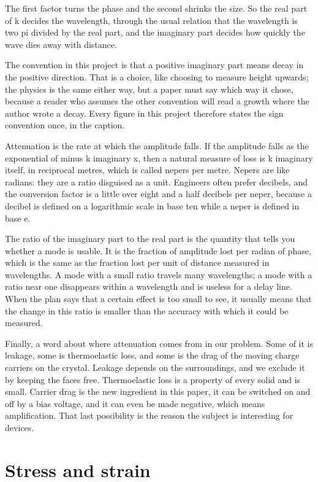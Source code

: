 \documentclass[11pt]{article}
\begin{document}
The first factor turns the phase and the second shrinks the size. So the real part of k decides the
wavelength, through the usual relation that the wavelength is two pi divided by the real part, and the
imaginary part decides how quickly the wave dies away with distance.

The convention in this project is that a positive imaginary part means decay in the positive direction. That
is a choice, like choosing to measure height upwards; the physics is the same either way, but a paper must
say which way it chose, because a reader who assumes the other convention will read a growth where the
author wrote a decay. Every figure in this project therefore states the sign convention once, in the caption.

Attenuation is the rate at which the amplitude falls. If the amplitude falls as the exponential of minus k
imaginary x, then a natural measure of loss is k imaginary itself, in reciprocal metres, which is called
nepers per metre. Nepers are like radians: they are a ratio disguised as a unit. Engineers often prefer
decibels, and the conversion factor is a little over eight and a half decibels per neper, because a decibel
is defined on a logarithmic scale in base ten while a neper is defined in base e.

The ratio of the imaginary part to the real part is the quantity that tells you whether a mode is usable. It
is the fraction of amplitude lost per radian of phase, which is the same as the fraction lost per unit of
distance measured in wavelengths. A mode with a small ratio travels many wavelengths; a mode with a ratio
near one disappears within a wavelength and is useless for a delay line. When the plan says that a certain
effect is too small to see, it usually means that the change in this ratio is smaller than the accuracy with
which it could be measured.

Finally, a word about where attenuation comes from in our problem. Some of it is leakage, some is
thermoelastic loss, and some is the drag of the moving charge carriers on the crystal. Leakage depends on the
surroundings, and we exclude it by keeping the faces free. Thermoelastic loss is a property of every solid
and is small. Carrier drag is the new ingredient in this paper, it can be switched on and off by a bias
voltage, and it can even be made negative, which means amplification. That last possibility is the reason the
subject is interesting for devices.

\section{Stress and strain}
\end{document}
